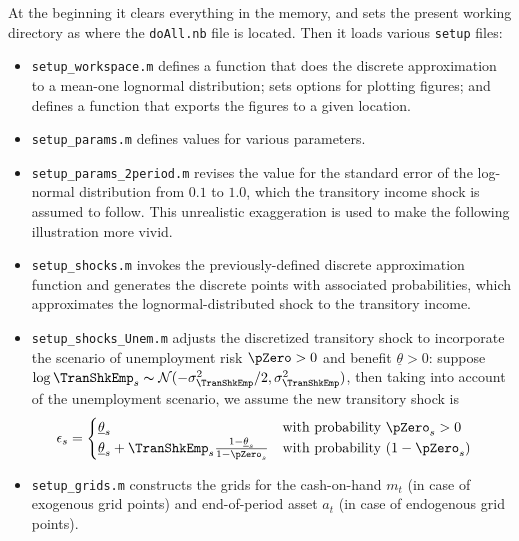 \documentclass[titlepage,abstract]{\econtex}
\providecommand{\thetaMin}{\underline{\theta}}
\begin{document}
At the beginning it clears everything in the memory, and sets the present working directory as where the \texttt{doAll.nb} file is located. Then it loads various \texttt{setup} files:
\begin{itemize}
      \item \texttt{setup\_workspace.m} defines a function that does the discrete approximation to a mean-one lognormal distribution; sets options for plotting figures; and defines a function that exports the figures to a given location.
      \item \texttt{setup\_params.m} defines values for various parameters.
      \item \texttt{setup\_params\_2period.m} revises the value for the standard error of the log-normal distribution from $0.1$ to $1.0$, which the transitory income shock is assumed to follow. This unrealistic exaggeration is used to make the following illustration more vivid.
      \item \texttt{setup\_shocks.m} invokes the previously-defined discrete approximation function and generates the discrete points with associated probabilities, which approximates the lognormal-distributed shock to the transitory income.
      \item \texttt{setup\_shocks\_Unem.m} adjusts the discretized transitory shock to incorporate the scenario of unemployment risk $\pZero>0$ and benefit $\thetaMin>0$: suppose $\log \TranShkEmp_{s}\thicksim \mathcal{N}(-\sigma_{\TranShkEmp}^{2}/2, \sigma_{\TranShkEmp}^{2})$, then taking into account of the unemployment scenario, we assume the new transitory shock is
          \begin{equation}\begin{gathered}\begin{aligned}
          \epsilon_{s}  & =  
          \begin{cases}
            \thetaMin_{s} & \text{with probability $\pZero_{s}>0$} \\
            \thetaMin_{s} + \TranShkEmp_{s}\frac{1-\thetaMin_{s}}{1-\pZero_{s}}  & \text{with probability $(1-\pZero_{s})$}
          \end{cases}
          \end{aligned}\end{gathered}\end{equation}
      \item \texttt{setup\_grids.m} constructs the grids for the cash-on-hand $m_{t}$ (in case of exogenous grid points) and end-of-period asset $a_{t}$ (in case of endogenous grid points).

\end{itemize}
\end{document}

